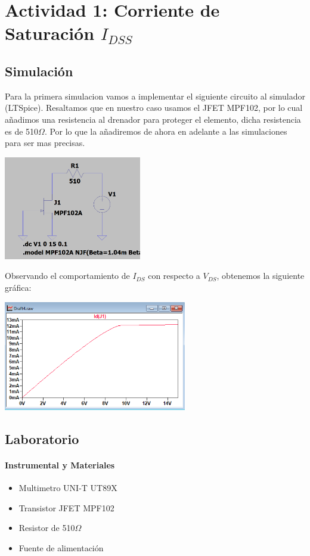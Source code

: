 \section{Actividad 1: Corriente de Saturación $I_{DSS}$}

\subsection{Simulación}

Para la primera simulacion vamos a implementar el siguiente circuito al simulador (LTSpice).
Resaltamos que en nuestro caso usamos el JFET MPF102, por lo cual añadimos una resistencia al drenador para proteger el elemento, dicha resistencia es de 510$\Omega$. Por lo que la añadiremos de ahora en adelante a las simulaciones para ser mas precisas.

\includegraphics[width=6cm]{./imagenes/Circ1.png}

Observando el comportamiento de $I_{DS}$ con respecto a $V_{DS}$, obtenemos la siguiente gráfica:

\includegraphics[width=8cm]{./imagenes/Sim1.png}

\subsection{Laboratorio}

\paragraph{Instrumental y Materiales}
\begin{itemize}
    \item Multimetro UNI-T UT89X
    \item Transistor JFET MPF102
    \item Resistor de 510$\Omega$
    \item Fuente de alimentación
\end{itemize}

